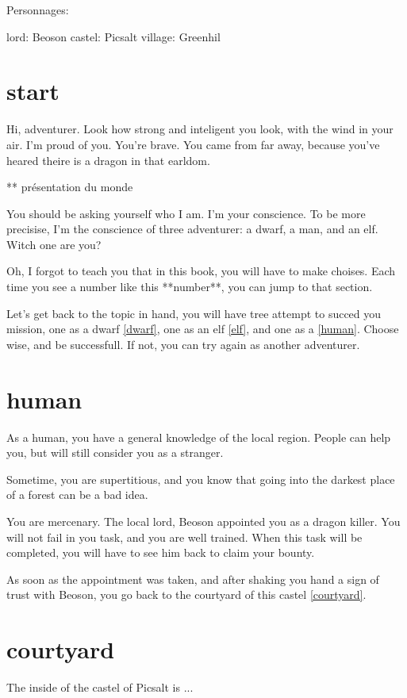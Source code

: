 Personnages:

lord: Beoson
castel: Picsalt
village: Greenhil

\section{start}

Hi, adventurer. Look how strong and inteligent you look, with the wind in your
air. I'm proud of you. You're brave. You came from far away, because you've
heared theire is a dragon in that earldom.

** présentation du monde

You should be asking yourself who I am. I'm your conscience. To be more
precisise, I'm the conscience of three adventurer: a dwarf, a man, and an elf.
Witch one are you?

Oh, I forgot to teach you that in this book, you will have to make choises. Each
time you see a number like this **number**, you can jump to that section.

Let's get back to the topic in hand, you will have tree attempt to succed you
mission, one as a dwarf \ref{dwarf}, one as an elf \ref{elf}, and one as a
\ref{human}. Choose wise, and be successfull. If not, you can try again as
another adventurer.

\section{human}

As a human, you have a general knowledge of the local region. People can help
you, but will still consider you as a stranger.

Sometime, you are supertitious, and you know that going into the darkest place
of a forest can be a bad idea.

You are mercenary. The local lord, Beoson appointed you as a dragon killer. You
will not fail in you task, and you are well trained. When this task will be
completed, you will have to see him back to claim your bounty.

As soon as the appointment was taken, and after shaking you hand a sign of trust
with Beoson, you go back to the courtyard of this castel \ref{courtyard}.

\section{courtyard}

The inside of the castel of Picsalt is ...

